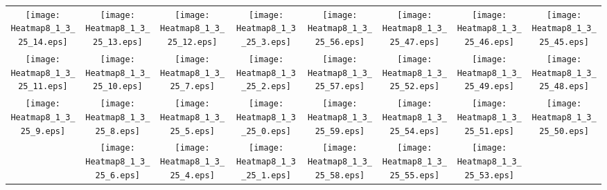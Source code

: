 \documentclass{standalone}
\begin{document}
\begin{tabular}{ *8{c} }
\texttt{[image: Heatmap8\_1\_3\_25\_14.eps]} & \texttt{[image: Heatmap8\_1\_3\_25\_13.eps]} & \texttt{[image: Heatmap8\_1\_3\_25\_12.eps]} & \texttt{[image: Heatmap8\_1\_3\_25\_3.eps]} & \texttt{[image: Heatmap8\_1\_3\_25\_56.eps]} & \texttt{[image: Heatmap8\_1\_3\_25\_47.eps]} & \texttt{[image: Heatmap8\_1\_3\_25\_46.eps]} & \texttt{[image: Heatmap8\_1\_3\_25\_45.eps]} \\
\texttt{[image: Heatmap8\_1\_3\_25\_11.eps]} & \texttt{[image: Heatmap8\_1\_3\_25\_10.eps]} & \texttt{[image: Heatmap8\_1\_3\_25\_7.eps]} & \texttt{[image: Heatmap8\_1\_3\_25\_2.eps]} & \texttt{[image: Heatmap8\_1\_3\_25\_57.eps]} & \texttt{[image: Heatmap8\_1\_3\_25\_52.eps]} & \texttt{[image: Heatmap8\_1\_3\_25\_49.eps]} & \texttt{[image: Heatmap8\_1\_3\_25\_48.eps]} \\
\texttt{[image: Heatmap8\_1\_3\_25\_9.eps]} & \texttt{[image: Heatmap8\_1\_3\_25\_8.eps]} & \texttt{[image: Heatmap8\_1\_3\_25\_5.eps]} & \texttt{[image: Heatmap8\_1\_3\_25\_0.eps]} & \texttt{[image: Heatmap8\_1\_3\_25\_59.eps]} & \texttt{[image: Heatmap8\_1\_3\_25\_54.eps]} & \texttt{[image: Heatmap8\_1\_3\_25\_51.eps]} & \texttt{[image: Heatmap8\_1\_3\_25\_50.eps]} \\
 & \texttt{[image: Heatmap8\_1\_3\_25\_6.eps]} & \texttt{[image: Heatmap8\_1\_3\_25\_4.eps]} & \texttt{[image: Heatmap8\_1\_3\_25\_1.eps]} & \texttt{[image: Heatmap8\_1\_3\_25\_58.eps]} & \texttt{[image: Heatmap8\_1\_3\_25\_55.eps]} & \texttt{[image: Heatmap8\_1\_3\_25\_53.eps]} &  
\end{tabular}
\end{document}
